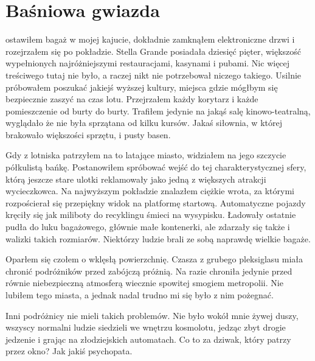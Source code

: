 \chapter{Baśniowa gwiazda} 



ostawiłem bagaż w mojej kajucie, dokładnie zamknąłem elektroniczne drzwi i rozejrzałem się po pokładzie.
Stella Grande posiadała dziesięć pięter, większość wypełnionych najróżniejszymi restauracjami, kasynami i pubami.
Nic więcej treściwego tutaj nie było, a raczej nikt nie potrzebował niczego takiego.
Usilnie próbowałem poszukać jakiejś wyższej kultury, miejsca gdzie mógłbym się bezpiecznie zaszyć na czas lotu.
Przejrzałem każdy korytarz i każde pomieszczenie od burty do burty.
Trafiłem jedynie na jakąś salę kinowo-teatralną, wyglądało że nie była sprzątana od kilku kursów.
Jakaś siłownia, w której brakowało większości sprzętu, i pusty basen.

Gdy z lotniska patrzyłem na to latające miasto, widziałem na jego szczycie półkulistą bańkę.
Postanowiłem spróbować wejść do tej charakterystycznej sfery, którą jeszcze stare ulotki reklamowały jako jedną z większych atrakcji wycieczkowca.
Na najwyższym pokładzie znalazłem ciężkie wrota, za którymi rozpościerał się przepiękny widok na platformę startową.
Automatyczne pojazdy kręciły się jak miliboty do recyklingu śmieci na wysypisku.
Ładowały ostatnie pudła do luku bagażowego, głównie małe kontenerki, ale zdarzały się także i walizki takich rozmiarów.
Niektórzy ludzie brali ze sobą naprawdę wielkie bagaże.

Oparłem się czołem o wklęsłą powierzchnię.
Czasza z grubego pleksiglasu miała chronić podróżników przed zabójczą próżnią.
Na razie chroniła jedynie przed równie niebezpieczną atmosferą wiecznie spowitej smogiem metropolii.
Nie lubiłem tego miasta, a jednak nadal trudno mi się było z nim pożegnać.

Inni podróżnicy nie mieli takich problemów.
Nie było wokół mnie żywej duszy, wszyscy normalni ludzie siedzieli we wnętrzu kosmolotu, jedząc zbyt drogie jedzenie i grając na złodziejskich automatach.
Co to za dziwak, który patrzy przez okno? Jak jakiś psychopata.

